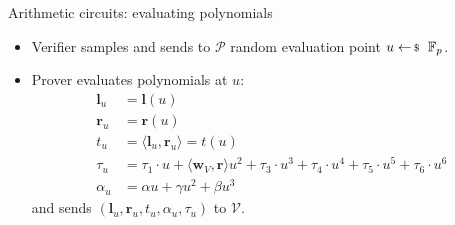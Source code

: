 \documentclass{zkdl-presentation-template}
\begin{document}
    \begin{frame}{Arithmetic circuits: evaluating polynomials}
        \begin{itemize}
            \item Verifier samples and sends to $\mathcal{P}$ random evaluation point $u \leftarrowS \mathbb{F}_p$.\pause
            \item Prover evaluates polynomials at $u$:
                \begin{equation*}
                    \begin{aligned}
                        \mathbf{l}_u &= \mathbf{l}(u) \\
                        \mathbf{r}_u &= \mathbf{r}(u) \\
                        t_u &= \langle \mathbf{l}_u, \mathbf{r}_u \rangle = t(u) \\
                        \tau_u &= \tau_1 \cdot u + \langle \mathbf{w}_V, \mathbf{r} \rangle u^2 + \tau_3 \cdot u^3 + \tau_4 \cdot u^4 + \tau_5 \cdot u^5 + \tau_6 \cdot u^6\\
                        \alpha_u &= \alpha u + \gamma u^2 + \beta u^3
                    \end{aligned}
                \end{equation*}
                and sends $(\mathbf{l}_u, \mathbf{r}_u, t_u, \alpha_u, \tau_u)$ to $\mathcal{V}$.
        \end{itemize}
    \end{frame}
\end{document}
